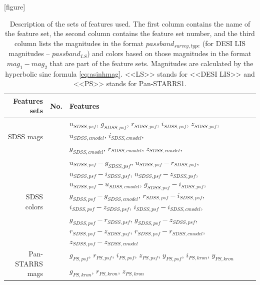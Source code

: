 \documentclass[fleqn,usenatbib]{mnras}
\begin{document}
\begin{table}
    \label{tab:featuressets}
    \caption{Description of the sets of features used. The first column contains the name of the feature set, the second column contains the feature set number, and the third column lists the magnitudes in the format $passband_{survey, type}$ (for DESI LIS magnitudes -- $passband_{LS}$) and colors based on those magnitudes in the format $mag_1 - mag_2$ that are part of the feature sets. Magnitudes are calculated by the hyperbolic sine formula \eqref{eq:asinhmag}. <<LS>> stands for <<DESI LIS>> and <<PS>> stands for Pan-STARRS1.}
    [figure] 
    \renewcommand{\theFeatsSetNumber}{\arabic{FeatsSetNumber}}
    \setcounter{FeatsSetNumber}{0}
	\begin{tabular}{ r l p{10cm} }
	\hline
	    Features sets & No. & Features \\
    \hline
        \multirow{2}{*}{SDSS mags} & {FeatsSetNumber}\theFeatsSetNumber\label{feats:sdss-mags-1} & \(u_{SDSS,psf}\), \(g_{SDSS,psf}\), \(r_{SDSS,psf}\), \(i_{SDSS,psf}\), \(z_{SDSS,psf}\), \(u_{SDSS,cmodel}\), \(i_{SDSS,cmodel}\), \\
         & {FeatsSetNumber}\theFeatsSetNumber\label{feats:sdss-mags-2} & \(g_{SDSS,cmodel}\), \(r_{SDSS,cmodel}\), \(z_{SDSS,cmodel}\), \\
        \multirow{2}{*}{SDSS colors} & {FeatsSetNumber}\theFeatsSetNumber\label{feats:sdss-colors-1} & \(u_{SDSS,psf}-g_{SDSS,psf}\), \(u_{SDSS,psf}-r_{SDSS,psf}\), \(u_{SDSS,psf}-i_{SDSS,psf}\), \(u_{SDSS,psf}-z_{SDSS,psf}\), \(u_{SDSS,psf}-u_{SDSS,cmodel}\), \(g_{SDSS,psf}-i_{SDSS,psf}\), \(g_{SDSS,psf}-g_{SDSS,cmodel}\), \(r_{SDSS,psf}-i_{SDSS,psf}\), \(i_{SDSS,psf}-z_{SDSS,psf}\), \(i_{SDSS,psf}-i_{SDSS,cmodel}\), \\
         & {FeatsSetNumber}\theFeatsSetNumber\label{feats:sdss-colors-2} & \(g_{SDSS,psf}-r_{SDSS,psf}\), \(g_{SDSS,psf}-z_{SDSS,psf}\), \(r_{SDSS,psf}-z_{SDSS,psf}\), \(r_{SDSS,psf}-r_{SDSS,cmodel}\), \(z_{SDSS,psf}-z_{SDSS,cmodel}\) \\
    \hline
        \multirow{2}{*}{Pan-STARRS mags} & {FeatsSetNumber}\theFeatsSetNumber\label{feats:ps-mags-1} & \(g_{PS,psf}\), \(r_{PS,psf}\), \(i_{PS,psf}\), \(z_{PS,psf}\), \(y_{PS,psf}\), \(i_{PS,kron}\), \(y_{PS,kron}\) \\
         & {FeatsSetNumber}\theFeatsSetNumber\label{feats:ps-mags-2} & \(g_{PS,kron}\), \(r_{PS,kron}\), \(z_{PS,kron}\) \\

\end{tabular}
\end{table}
\end{document}
